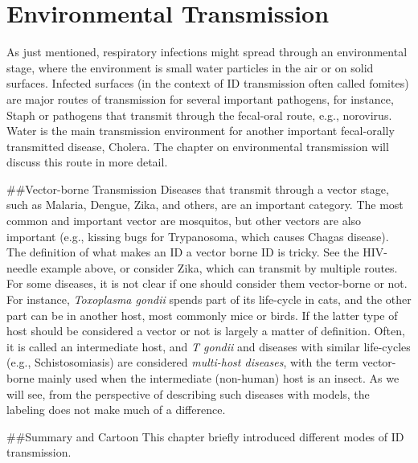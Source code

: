 \documentclass[]{book}
\theoremstyle{definition}
\theoremstyle{definition}
\theoremstyle{definition}
\theoremstyle{remark}
\begin{document}
\hypertarget{environmental-transmission}{%
\section{Environmental Transmission}\label{environmental-transmission}}

As just mentioned, respiratory infections might spread through an
environmental stage, where the environment is small water particles in
the air or on solid surfaces. Infected surfaces (in the context of ID
transmission often called fomites) are major routes of transmission for
several important pathogens, for instance, Staph or pathogens that
transmit through the fecal-oral route, e.g., norovirus. Water is the
main transmission environment for another important fecal-orally
transmitted disease, Cholera. The chapter on environmental transmission
will discuss this route in more detail.

\#\#Vector-borne Transmission Diseases that transmit through a vector
stage, such as Malaria, Dengue, Zika, and others, are an important
category. The most common and important vector are mosquitos, but other
vectors are also important (e.g., kissing bugs for Trypanosoma, which
causes Chagas disease). The definition of what makes an ID a vector
borne ID is tricky. See the HIV-needle example above, or consider Zika,
which can transmit by multiple routes. For some diseases, it is not
clear if one should consider them vector-borne or not. For instance,
\emph{Toxoplasma gondii} spends part of its life-cycle in cats, and the
other part can be in another host, most commonly mice or birds. If the
latter type of host should be considered a vector or not is largely a
matter of definition. Often, it is called an intermediate host, and
\emph{T gondii} and diseases with similar life-cycles (e.g.,
Schistosomiasis) are considered \emph{multi-host diseases}, with the
term vector-borne mainly used when the intermediate (non-human) host is
an insect. As we will see, from the perspective of describing such
diseases with models, the labeling does not make much of a difference.

\#\#Summary and Cartoon This chapter briefly introduced different modes
of ID transmission.
\end{document}
